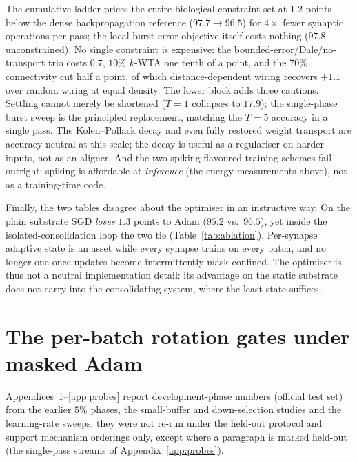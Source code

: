 \documentclass{article}
\newcommand{\kwta}{$k$-WTA}
\begin{document}
The cumulative ladder prices the entire biological constraint set at $1.2$ points below the
dense backpropagation reference ($97.7\to96.5$) for $4\times$ fewer synaptic operations per
pass; the local burst-error objective itself costs nothing ($97.8$ unconstrained). No single
constraint is expensive: the bounded-error/Dale/no-transport trio costs $0.7$, $10\%$
\kwta{} one tenth of a point, and the $70\%$ connectivity cut half a point, of which
distance-dependent wiring recovers $+1.1$ over random wiring at equal density. The lower
block adds three cautions. Settling cannot merely be shortened ($T{=}1$ collapses to
$17.9$); the single-phase burst sweep is the principled replacement, matching the $T{=}5$
accuracy in a single pass. The Kolen--Pollack decay and even fully restored weight transport
are accuracy-neutral at this scale; the decay is useful as a regulariser on harder inputs,
not as an aligner. And the two spiking-flavoured training schemes fail outright: spiking is
affordable at \emph{inference} (the energy measurements above), not as a training-time code.

Finally, the two tables disagree about the optimiser in an instructive way. On the plain
substrate SGD \emph{loses} $1.3$ points to Adam ($95.2$ vs.\ $96.5$), yet inside the
isolated-consolidation loop the two tie (Table~\ref{tab:ablation}). Per-synapse adaptive
state is an asset while every synapse trains on every batch, and no longer one once updates
become intermittently mask-confined. The optimiser is thus not a neutral implementation
detail: its advantage on the static substrate does not carry into the consolidating system,
where the least state suffices.

\section{The per-batch rotation gates under masked Adam}
\label{app:gates}
Appendices~\ref{app:gates}--\ref{app:probes} report development-phase numbers (official
test set) from the earlier $5\%$ phases, the small-buffer and down-selection studies and the
learning-rate sweeps; they were not re-run under the held-out protocol and support mechanism orderings only, except
where a paragraph is marked held-out (the single-pass streams of Appendix~\ref{app:probes}).
\end{document}
